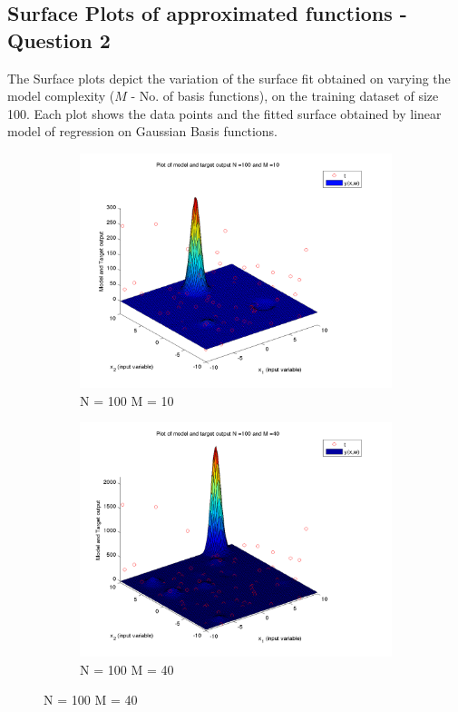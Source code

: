 \documentclass{article}
\begin{document}
\subsection{Surface Plots of approximated functions - Question 2}
\begin{flushleft}
The Surface plots depict the variation of the surface fit obtained on varying the model complexity ($M$ - No. of basis functions), on the training dataset of size 100. Each plot shows the data points and the fitted surface obtained by linear model of regression on Gaussian Basis functions.

\end{flushleft}
\begin{figure}[H]

\begin{subfigure}{.5\textwidth}
\centering
\includegraphics[width=\linewidth]{D2/VaryingM_N100M10}
\caption{N = 100 M = 10}
\end{subfigure}
\begin{subfigure}{.5\textwidth}
\includegraphics[width=\linewidth]{D2/VaryingM_N100M40}
\caption{N = 100 M = 40}
\end{subfigure}



\end{figure}
\end{document}
